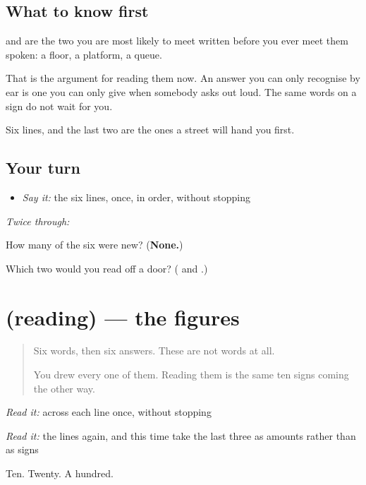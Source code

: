 \subsection*{What to know first}
\textbf{} and \textbf{} are the two you are most likely to meet written before you ever meet them spoken: a floor, a platform, a queue.

That is the argument for reading them now. An answer you can only recognise by ear is one you can only give when somebody asks out loud. The same words on a sign do not wait for you.

Six lines, and the last two are the ones a street will hand you first.

\subsection*{Your turn}
\begin{itemize}
\raggedright
  \item \emph{Say it:} the six lines, once, in order, without stopping
\end{itemize}

\emph{Twice through:}

\begin{tcolorbox}[breakable,colback=teal!4,colframe=teal!35!black,title={Before you move on}]
How many of the six were new? (\textbf{None.})

Which two would you read off a door? (\textbf{} and \textbf{}.)
\end{tcolorbox}
\section[(reading)]{(reading) — the figures}

\label{lesson:FA-C21-adad}



\begin{quote}
Six words, then six answers. These are not words at all.

You drew every one of them. Reading them is the same ten signs coming the other way.
\end{quote}

\begin{tcolorbox}[breakable,skin=enhanced,colback=orange!6,colframe=orange!45!black,boxrule=0.5pt,arc=1mm,left=6pt,right=6pt,top=4pt,bottom=4pt,fonttitle=\bfseries,title={Read this}]
\begin{quote}
            
\end{quote}

\emph{Read it:} across each line once, without stopping

\emph{Read it:} the lines again, and this time take the last three as amounts rather than as signs

Ten. Twenty. A hundred.
\end{tcolorbox}

